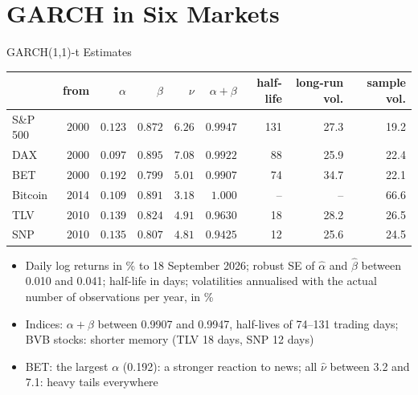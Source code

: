 \section{GARCH in Six Markets}

\begin{frame}{GARCH(1,1)-t Estimates}
\itemsize{\footnotesize}
\begin{center}
\scriptsize
\begin{tabular}{lrrrrrrrr}
\toprule
& from & $\alpha$ & $\beta$ & $\nu$ & $\alpha + \beta$ & half-life & long-run vol. & sample vol. \\
\midrule
S\&P 500 & 2000 & $0.123$ & $0.872$ & $6.26$ & $0.9947$ & 131 & 27.3 & 19.2 \\
DAX & 2000 & $0.097$ & $0.895$ & $7.08$ & $0.9922$ & 88 & 25.9 & 22.4 \\
BET & 2000 & $0.192$ & $0.799$ & $5.01$ & $0.9907$ & 74 & 34.7 & 22.1 \\
Bitcoin & 2014 & $0.109$ & $0.891$ & $3.18$ & $1.000$ & -- & -- & 66.6 \\
TLV & 2010 & $0.139$ & $0.824$ & $4.91$ & $0.9630$ & 18 & 28.2 & 26.5 \\
SNP & 2010 & $0.135$ & $0.807$ & $4.81$ & $0.9425$ & 12 & 25.6 & 24.5 \\
\bottomrule
\end{tabular}
\end{center}
\begin{itemize}
    \item Daily log returns in \% to 18 September 2026; robust SE of $\hat\alpha$ and $\hat\beta$ between 0.010 and 0.041; half-life in days; volatilities annualised with the actual number of observations per year, in \%
    \item Indices: $\alpha + \beta$ between 0.9907 and 0.9947, half-lives of 74--131 trading days; BVB stocks: shorter memory (TLV 18 days, SNP 12 days)
    \item BET: the largest $\alpha$ (0.192): a stronger reaction to news; all $\hat\nu$ between 3.2 and 7.1: heavy tails everywhere
\end{itemize}
\end{frame}

